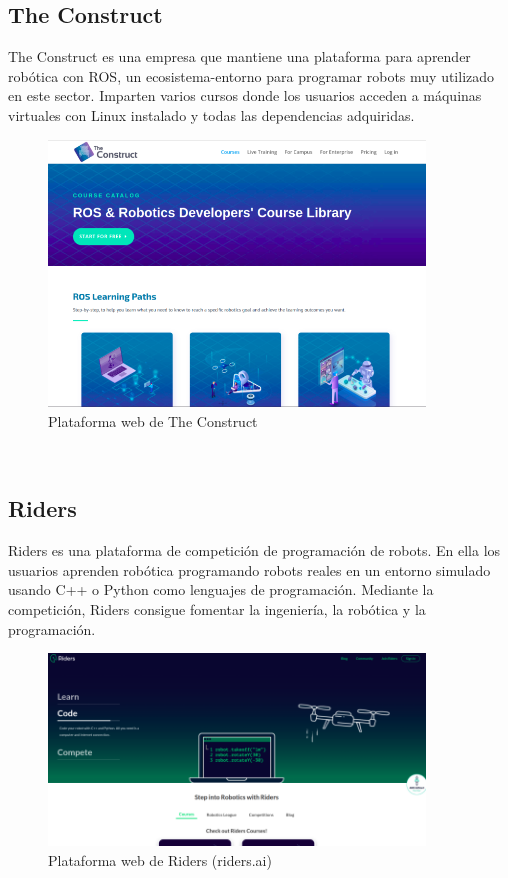 \subsection{The Construct}
\label{subsec:the_construct}
The Construct es una empresa que mantiene una plataforma para aprender robótica con ROS, un ecosistema-entorno para programar robots muy utilizado en este sector. Imparten varios cursos donde los usuarios acceden a máquinas virtuales con Linux instalado y todas las dependencias adquiridas.\\

\begin{figure}[H]
  \begin{center}
    \includegraphics[width=10cm]{imagenes/cap1/the-construct.png}
  \end{center}
  \caption[Plataforma web de The Construct]{Plataforma web de The Construct\cite{the-construct}}
  \label{fig:the-construct}
\end{figure}\

\subsection{Riders}
\label{subsec:riders}
Riders es una plataforma de competición de programación de robots. En ella los usuarios aprenden robótica programando robots reales en un entorno simulado usando C++ o Python como lenguajes de programación. Mediante la competición, Riders consigue fomentar la ingeniería, la robótica y la programación.\\

\begin{figure}[H]
  \begin{center}
    \includegraphics[width=10cm]{imagenes/cap1/riders.png}
  \end{center}
  \caption[Plataforma web de Riders (riders.ai)]{Plataforma web de Riders (riders.ai) \cite{riders}}
  \label{fig:riders-ai}
\end{figure}\



